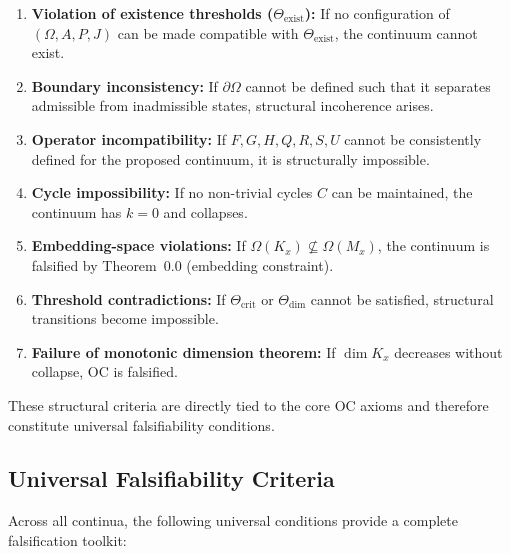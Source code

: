 \begin{enumerate}
    \item \textbf{Violation of existence thresholds ($\Theta_{\mathrm{exist}}$):}  
          If no configuration of $(\Omega, A, P, J)$ can be made compatible
          with $\Theta_{\mathrm{exist}}$, the continuum cannot exist.

    \item \textbf{Boundary inconsistency:}  
          If $\partial\Omega$ cannot be defined such that it separates
          admissible from inadmissible states, structural incoherence arises.

    \item \textbf{Operator incompatibility:}  
          If $F, G, H, Q, R, S, U$ cannot be consistently defined for the
          proposed continuum, it is structurally impossible.

    \item \textbf{Cycle impossibility:}  
          If no non-trivial cycles $C$ can be maintained, the continuum has
          $k=0$ and collapses.

    \item \textbf{Embedding-space violations:}  
          If $\Omega(K_x) \not\subseteq \Omega(M_x)$, the continuum is
          falsified by Theorem~0.0 (embedding constraint).

    \item \textbf{Threshold contradictions:}  
          If $\Theta_{\mathrm{crit}}$ or $\Theta_{\mathrm{dim}}$ cannot be 
          satisfied, structural transitions become impossible.

    \item \textbf{Failure of monotonic dimension theorem:}  
          If $\dim K_x$ decreases without collapse, OC is falsified.
\end{enumerate}

These structural criteria are directly tied to the core OC axioms and
therefore constitute universal falsifiability conditions.



\subsection{Universal Falsifiability Criteria}

Across all continua, the following universal conditions provide
a complete falsification toolkit:

